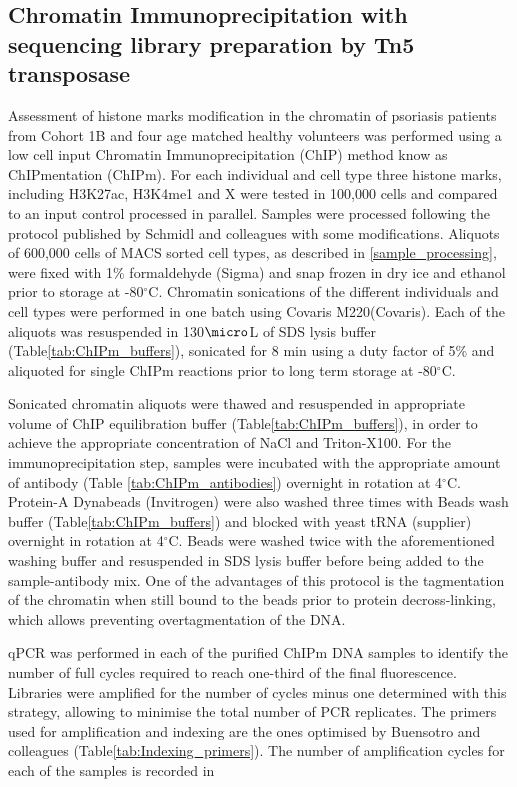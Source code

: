 \subsection{Chromatin Immunoprecipitation with sequencing library preparation by Tn5 transposase}
Assessment of histone marks modification in the chromatin of psoriasis patients from Cohort 1B and four age matched healthy volunteers was performed using a low cell input Chromatin Immunoprecipitation (ChIP) method know as ChIPmentation (ChIPm). For each individual and cell type three histone marks, including H3K27ac, H3K4me1 and X were tested in 100,000 cells and compared to an input control processed in parallel. Samples were processed following the protocol published by Schmidl and colleagues \parencite{Schmidl2015} with some modifications. Aliquots of 600,000 cells of MACS sorted cell types, as described in \ref{sample_processing}, were fixed with 1\% formaldehyde (Sigma) and snap frozen in dry ice and ethanol prior to storage at -80{$^\circ$}C. Chromatin sonications of the different individuals and cell types were performed in one batch using Covaris M220(Covaris). Each of the aliquots was resuspended in 130$\micro$L of SDS lysis buffer (Table\ref{tab:ChIPm_buffers}), sonicated for 8 min using a duty factor of 5\% and aliquoted for single ChIPm reactions prior to long term storage at -80{$^\circ$}C.

Sonicated chromatin aliquots were thawed and resuspended in appropriate volume of ChIP equilibration buffer (Table\ref{tab:ChIPm_buffers}), in order to achieve the appropriate concentration of NaCl and Triton-X100. For the immunoprecipitation step, samples were incubated with the appropriate amount of antibody (Table \ref{tab:ChIPm_antibodies}) overnight in rotation  at 4{$^\circ$}C. Protein-A Dynabeads (Invitrogen) were also washed three times with Beads wash buffer (Table\ref{tab:ChIPm_buffers}) and blocked with yeast tRNA (supplier) overnight in rotation at 4{$^\circ$}C. Beads were washed twice with the aforementioned washing buffer and resuspended in SDS lysis buffer before being added to the sample-antibody mix. One of the advantages of this protocol is the tagmentation of the chromatin when still bound to the beads prior to protein decross-linking, which allows preventing overtagmentation of the DNA. 

qPCR was performed in each of the purified ChIPm DNA samples to identify the number of full cycles required to reach one-third of the final fluorescence. Libraries were amplified for the number of cycles minus one determined with this strategy, allowing to minimise the total number of PCR replicates. The primers used for amplification and indexing are the ones optimised by Buensotro and colleagues (Table\ref{tab:Indexing_primers}). The number of amplification cycles for each of the samples is recorded in %

